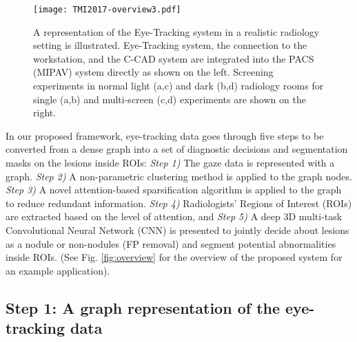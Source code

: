 \documentclass[preprint,12pt]{elsarticle}
\begin{document}
\begin{figure}[h]
%
%
%
%
\centering\texttt{[image: TMI2017-overview3.pdf]}
\caption{A representation of the Eye-Tracking system in a realistic  radiology setting is illustrated. Eye-Tracking system, the connection to the workstation, and the C-CAD system are integrated into the PACS (MIPAV) system directly as shown on the left. Screening experiments in normal light (a,c) and dark (b,d) radiology rooms for single (a,b) and multi-screen (c,d) experiments are shown on the right.\label{fig:data}}
\end{figure}



In our proposed framework, eye-tracking data goes through five steps to be converted from a dense graph into a set of diagnostic decisions and segmentation masks on the lesions inside ROIs: \textit{Step 1)} The gaze data is represented with a graph. \textit{Step 2)} A non-parametric clustering method is applied to the graph nodes.\textit{ Step 3)} A novel attention-based sparsification algorithm is applied to the graph to reduce redundant information. \textit{Step 4)} Radiologists' Regions of Interest (ROIs) are extracted based on the level of attention, and  \textit{Step 5)} A deep 3D multi-task Convolutional Neural Network (CNN) is presented to jointly decide about lesions as a nodule or non-nodules (FP removal) and segment potential abnormalities inside ROIs. (See Fig. \ref{fig:overview} for the overview of the proposed system for an example application).



\subsection{Step 1: A graph representation of the eye-tracking data}
\end{document}
